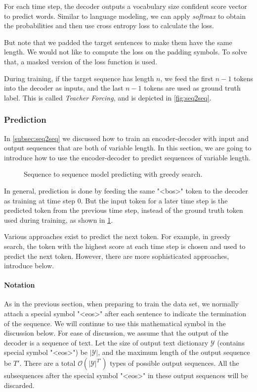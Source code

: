 For each time step, the decoder outputs a vocabulary size confident score vector to predict words. Similar to language modeling, we can apply \textit{softmax} to obtain the probabilities and then use cross entropy loss to calculate the loss. 

But note that we padded the target sentences to make them have the same length. We would not like to compute the loss on the padding symbols. To solve that, a masked version of the loss function is used.

During training, if the target sequence has length $n$, we feed the first $n-1$ tokens into the decoder as inputs, and the last $n-1$ tokens are used as ground truth label. This is called \textit{Teacher Forcing}, and is depicted in \cref{fig:seq2seq}.

\subsubsection{Prediction}

In \cref{subsec:seq2seq}  we discussed how to train an encoder-decoder with input and output sequences that are both of variable length. In this section, we are going to introduce how to use the encoder-decoder to predict sequences of variable length.

\begin{figure}[hpt]
	\centering
	
	\caption{Sequence to sequence model predicting with greedy search.}
	\label{fig:seq2seq_predict}
\end{figure}

In general, prediction is done by feeding the same "<bos>" token to the decoder as training at time step 0. But the input token for a later time step is the predicted token from the previous time step, instead of the ground truth token used during training, as shown in \cref{fig:seq2seq_predict}.

Various approaches exist to predict the next token. For example, in greedy search, the token with the highest score at each time step is chosen and used to predict the next token. However, there are more sophisticated approaches, introduce below. 

\paragraph{Notation}

As in the previous section, when preparing to train the data set, we normally attach a special symbol "<eos>" after each sentence to indicate the termination of the sequence. We will continue to use this mathematical symbol in the discussion below. For ease of discussion, we assume that the output of the decoder is a sequence of text. Let the size of output text dictionary $\mathcal{Y}$ (contains special symbol "<eos>") be $\left|\mathcal{Y}\right|$, and the maximum length of the output sequence be $T'$. There are a total $\mathcal{O}(\left|\mathcal{Y}\right|^{T'})$ types of possible output sequences. All the subsequences after the special symbol "<eos>" in these output sequences will be discarded.


